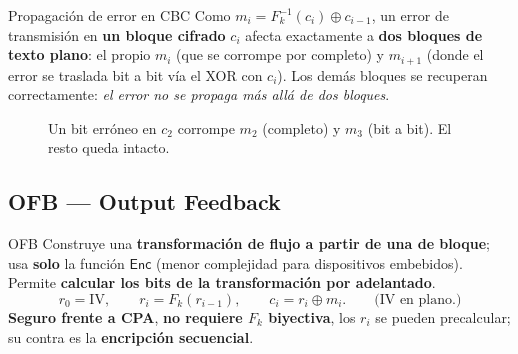 \documentclass[11pt,a4paper]{article}
\newcommand{\xor}{\oplus}
\newcommand{\Enc}{\mathsf{Enc}}
\begin{document}
\begin{warnbox}{Propagación de error en CBC}
Como $m_i = F_k^{-1}(c_i)\xor c_{i-1}$, un error de transmisión en \textbf{un bloque
cifrado} $c_i$ afecta exactamente a \textbf{dos bloques de texto plano}: el propio $m_i$
(que se corrompe por completo) y $m_{i+1}$ (donde el error se traslada bit a bit vía el
XOR con $c_i$). Los demás bloques se recuperan correctamente: \emph{el error no se
propaga más allá de dos bloques}.
\end{warnbox}

\begin{figure}[h]
\centering
{}
\caption{Un bit erróneo en $c_2$ corrompe $m_2$ (completo) y $m_3$ (bit a bit). El resto
queda intacto.}
\end{figure}

\subsection{OFB — Output Feedback}

\begin{defbox}{OFB}
Construye una \textbf{transformación de flujo a partir de una de bloque}; usa
\textbf{solo} la función $\Enc$ (menor complejidad para dispositivos embebidos). Permite
\textbf{calcular los bits de la transformación por adelantado}.
\[
  r_0=\mathrm{IV},\qquad r_i = F_k(r_{i-1}),\qquad c_i = r_i\xor m_i.\qquad\text{(IV en plano.)}
\]
\textbf{Seguro frente a CPA}, \textbf{no requiere $F_k$ biyectiva}, los $r_i$ se pueden
precalcular; su contra es la \textbf{encripción secuencial}.
\end{defbox}
\end{document}
